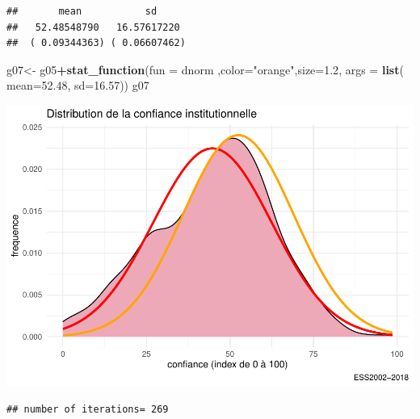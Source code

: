 \documentclass[
]{book}
\newenvironment{Shaded}{\begin{snugshade}}{\end{snugshade}}
\newcommand{\DataTypeTok}[1]{\textcolor[rgb]{0.13,0.29,0.53}{#1}}
\newcommand{\DecValTok}[1]{\textcolor[rgb]{0.00,0.00,0.81}{#1}}
\newcommand{\FloatTok}[1]{\textcolor[rgb]{0.00,0.00,0.81}{#1}}
\newcommand{\KeywordTok}[1]{\textcolor[rgb]{0.13,0.29,0.53}{\textbf{#1}}}
\newcommand{\NormalTok}[1]{#1}
\newcommand{\OperatorTok}[1]{\textcolor[rgb]{0.81,0.36,0.00}{\textbf{#1}}}
\newcommand{\StringTok}[1]{\textcolor[rgb]{0.31,0.60,0.02}{#1}}
\begin{document}
\begin{verbatim}
##       mean           sd     
##   52.48548790   16.57617220 
##  ( 0.09344363) ( 0.06607462)
\end{verbatim}

\begin{Shaded}
\begin{Highlighting}[]
\NormalTok{g07<-}\StringTok{ }\NormalTok{g05}\OperatorTok{+}\KeywordTok{stat_function}\NormalTok{(}\DataTypeTok{fun =}\NormalTok{  dnorm ,}\DataTypeTok{color=}\StringTok{"orange"}\NormalTok{,}\DataTypeTok{size=}\FloatTok{1.2}\NormalTok{, }\DataTypeTok{args =} \KeywordTok{list}\NormalTok{( }\DataTypeTok{mean=}\FloatTok{52.48}\NormalTok{,  }\DataTypeTok{sd=}\FloatTok{16.57}\NormalTok{))}
\NormalTok{g07}
\end{Highlighting}
\end{Shaded}

\includegraphics{bookdown-demo_files/figure-latex/307-1.pdf}

\begin{Shaded}
\end{Shaded}

\begin{verbatim}
## number of iterations= 269
\end{verbatim}

\begin{Shaded}
\end{Shaded}
\end{document}
